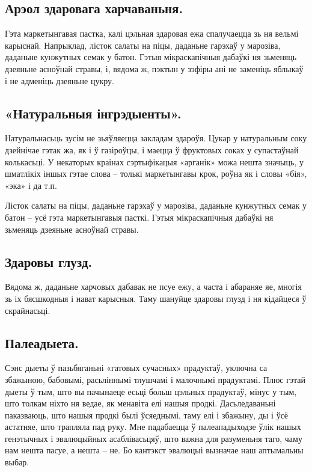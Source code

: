 \subsection{Арэол здаровага харчаваньня.}
Гэта маркетынгавая пастка, калі цэльная здаровая ежа спалучаецца зь ня вельмі карыснай. Напрыклад, лісток салаты на піцы, даданьне гарэхаў у марозіва, даданьне кунжутных семак у батон. Гэтыя мікраскапічныя дабаўкі ня зьменяць дзеяньне асноўнай стравы, і, вядома ж, пэктын у зэфіры ані не заменіць яблыкаў і не адменіць дзеяньне цукру.

\subsection{«Натуральныя інгрэдыенты».}
Натуральнасьць зусім не зьяўляецца закладам здароўя. Цукар у натуральным соку дзейнічае гэтак жа, як і ў газіроўцы, і маецца ў фруктовых соках у супастаўнай колькасьці. У некаторых краінах сэртыфікацыя «арганік» можа нешта значыць, у шматлікіх іншых гэтае слова – толькі маркетынгавы крок, роўна як і словы «бія», «эка» і да т.п.

Лісток салаты на піцы, даданьне гарэхаў у марозіва, даданьне кунжутных семак у батон – усё гэта маркетынгавыя пасткі. Гэтыя мікраскапічныя дабаўкі ня зьменяць дзеяньне асноўнай стравы.

\subsection{Здаровы глузд.}
Вядома ж, даданьне харчовых дабавак не псуе ежу, а часта і абараняе яе, многія зь іх бясшкодныя і нават карысныя. Таму шануйце здаровы глузд і ня кідайцеся ў скрайнасьці.

\subsection{Палеадыета.}
Сэнс дыеты ў пазьбяганьні «гатовых сучасных» прадуктаў, уключна са збажыною, бабовымі, расьліннымі тлушчамі і малочнымі прадуктамі. Плюс гэтай дыеты ў тым, што вы пачынаеце есьці больш цэльных прадуктаў, мінус у тым, што толкам ніхто ня ведае, як менавіта елі нашыя продкі. Дасьледаваньні паказваюць, што нашыя продкі былі ўсяеднымі, таму елі і збажыну, ды і ўсё астатняе, што трапляла пад руку. Мне падабаецца ў палеападыходзе ўлік нашых генэтычных і эвалюцыйных асаблівасьцяў, што важна для разуменьня таго, чаму нам нешта пасуе, а нешта – не. Бо кантэкст эвалюцыі вызначае наш аптымальны выбар.
